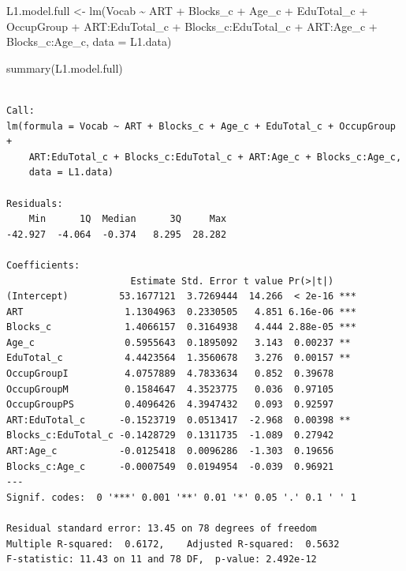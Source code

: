\documentclass[
  letterpaper,
  DIV=11,
  numbers=noendperiod]{scrreprt}
\newenvironment{Shaded}{\begin{snugshade}}{\end{snugshade}}
\newcommand{\AttributeTok}[1]{\textcolor[rgb]{0.40,0.45,0.13}{#1}}
\newcommand{\FunctionTok}[1]{\textcolor[rgb]{0.28,0.35,0.67}{#1}}
\newcommand{\NormalTok}[1]{\textcolor[rgb]{0.00,0.23,0.31}{#1}}
\newcommand{\OtherTok}[1]{\textcolor[rgb]{0.00,0.23,0.31}{#1}}
\newcommand{\SpecialCharTok}[1]{\textcolor[rgb]{0.37,0.37,0.37}{#1}}
\begin{document}
\begin{Shaded}
\begin{Highlighting}[]
\NormalTok{L1.model.full }\OtherTok{\textless{}{-}} \FunctionTok{lm}\NormalTok{(Vocab }\SpecialCharTok{\textasciitilde{}}\NormalTok{ ART }\SpecialCharTok{+}\NormalTok{ Blocks\_c }\SpecialCharTok{+}\NormalTok{ Age\_c }\SpecialCharTok{+}\NormalTok{ EduTotal\_c }\SpecialCharTok{+}\NormalTok{ OccupGroup }\SpecialCharTok{+}\NormalTok{ ART}\SpecialCharTok{:}\NormalTok{EduTotal\_c }\SpecialCharTok{+}\NormalTok{ Blocks\_c}\SpecialCharTok{:}\NormalTok{EduTotal\_c }\SpecialCharTok{+}\NormalTok{ ART}\SpecialCharTok{:}\NormalTok{Age\_c }\SpecialCharTok{+}\NormalTok{ Blocks\_c}\SpecialCharTok{:}\NormalTok{Age\_c, }
           \AttributeTok{data =}\NormalTok{ L1.data)}

\FunctionTok{summary}\NormalTok{(L1.model.full)}
\end{Highlighting}
\end{Shaded}

\begin{verbatim}

Call:
lm(formula = Vocab ~ ART + Blocks_c + Age_c + EduTotal_c + OccupGroup + 
    ART:EduTotal_c + Blocks_c:EduTotal_c + ART:Age_c + Blocks_c:Age_c, 
    data = L1.data)

Residuals:
    Min      1Q  Median      3Q     Max 
-42.927  -4.064  -0.374   8.295  28.282 

Coefficients:
                      Estimate Std. Error t value Pr(>|t|)    
(Intercept)         53.1677121  3.7269444  14.266  < 2e-16 ***
ART                  1.1304963  0.2330505   4.851 6.16e-06 ***
Blocks_c             1.4066157  0.3164938   4.444 2.88e-05 ***
Age_c                0.5955643  0.1895092   3.143  0.00237 ** 
EduTotal_c           4.4423564  1.3560678   3.276  0.00157 ** 
OccupGroupI          4.0757889  4.7833634   0.852  0.39678    
OccupGroupM          0.1584647  4.3523775   0.036  0.97105    
OccupGroupPS         0.4096426  4.3947432   0.093  0.92597    
ART:EduTotal_c      -0.1523719  0.0513417  -2.968  0.00398 ** 
Blocks_c:EduTotal_c -0.1428729  0.1311735  -1.089  0.27942    
ART:Age_c           -0.0125418  0.0096286  -1.303  0.19656    
Blocks_c:Age_c      -0.0007549  0.0194954  -0.039  0.96921    
---
Signif. codes:  0 '***' 0.001 '**' 0.01 '*' 0.05 '.' 0.1 ' ' 1

Residual standard error: 13.45 on 78 degrees of freedom
Multiple R-squared:  0.6172,    Adjusted R-squared:  0.5632 
F-statistic: 11.43 on 11 and 78 DF,  p-value: 2.492e-12
\end{verbatim}
\end{document}
